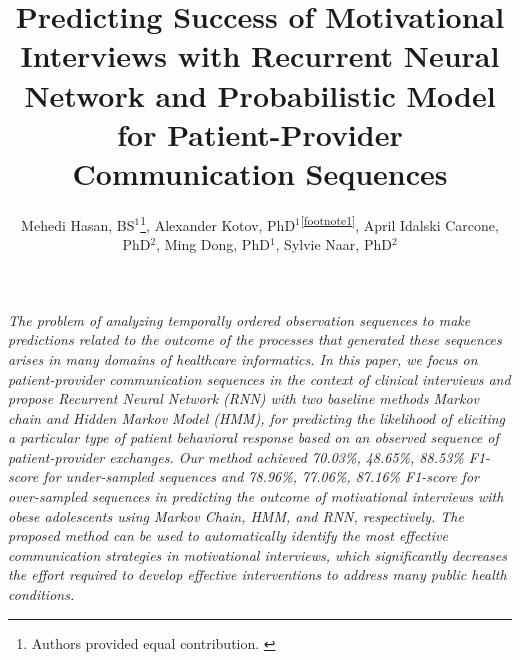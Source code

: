 \documentclass{amia_summit_2018}
\begin{document}
\title{Predicting Success of Motivational Interviews with Recurrent Neural Network and Probabilistic Model for Patient-Provider Communication Sequences}

\author{Mehedi Hasan, BS$^{1}$\footnote[1]{Authors provided equal contribution. \label{footnote1}}, Alexander Kotov, PhD$^{1}$\textsuperscript{\ref{footnote1}}, April Idalski Carcone, PhD$^{2}$, Ming Dong, PhD$^{1}$, Sylvie Naar, PhD$^{2}$}


\maketitle

\textit{The problem of analyzing temporally ordered observation sequences to make predictions related to the outcome of the processes that generated these sequences arises in many domains of healthcare informatics. In this paper, we focus on patient-provider communication sequences in the context of clinical interviews and propose Recurrent Neural Network (RNN) with two baseline methods Markov chain and Hidden Markov Model (HMM), for predicting the likelihood of eliciting a particular type of patient behavioral response based on an observed sequence of patient-provider exchanges. Our method achieved 70.03\%, 48.65\%, 88.53\% F1-score for under-sampled sequences and 78.96\%, 77.06\%, 87.16\% F1-score for over-sampled sequences in predicting the outcome of motivational interviews with obese adolescents using Markov Chain, HMM, and RNN, respectively. The proposed method can be used to automatically identify the most effective communication strategies in motivational interviews, which significantly decreases the effort required to develop effective interventions to address many public health conditions.}
\end{document}
